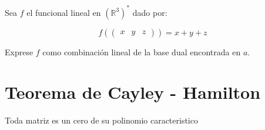 		\begin{ejercicio}
			Sea $f$ el funcional lineal en $\left( \mathbb{R}^3 \right)^*$ dado por:

			\begin{equation*}
				f(\begin{pmatrix} x & y & z \end{pmatrix}) = x + y + z
			\end{equation*}

			Exprese $f$ como combinación lineal de la base dual encontrada en $a$.
		\end{ejercicio}


\section{Teorema de Cayley - Hamilton}

	\begin{definicion}
		Toda matriz es un cero de su polinomio caracteristico
	\end{definicion}


